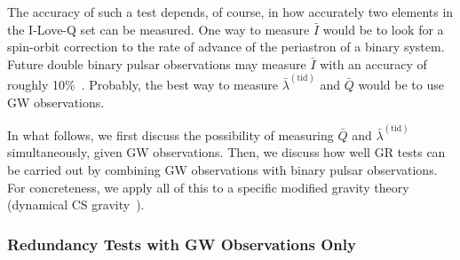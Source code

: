 \documentclass[aps,twocolumn,nofootinbib,showpacs,superscriptaddress,hyperref]{revtex4-1}
\newcommand{\tid}{\mathrm{(tid)}}
\newcommand{\lambdabartid}{\bar{\lambda}^\mathrm{(tid)}}
\newcommand{\Qbar}{\bar{Q}}
\begin{document}
The accuracy of such a test depends, of course, in how accurately two elements in the I-Love-Q set can be measured. One way to measure $\bar{I}$ would be to look for a spin-orbit correction to the rate of advance of the periastron of a binary system. Future double binary pulsar observations may measure $\bar{I}$ with an accuracy of roughly 10\%~\cite{lattimer-schutz,kramer-wex}. Probably, the best way to measure $\bar{\lambda}^\tid$ and $\Qbar$ would be to use GW observations. 

In what follows, we first discuss the possibility of measuring $\Qbar$ and $\lambdabartid$ simultaneously, given GW observations. Then, we discuss how well GR tests can be carried out by combining GW observations with binary pulsar observations. For concreteness, we apply all of this to a specific modified gravity theory (dynamical CS gravity~\cite{CSreview}).

\subsubsection{Redundancy Tests with GW Observations Only}
\end{document}
